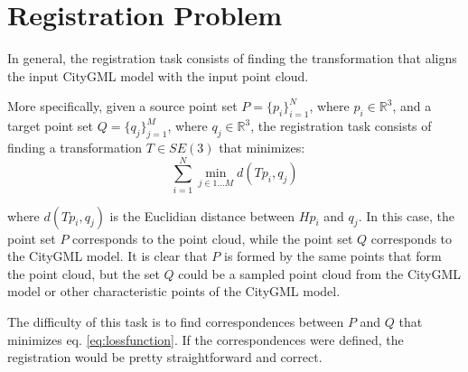     \section{Registration Problem}
    In general, the registration task consists of finding the transformation that aligns the input CityGML model with the input point cloud.

    More specifically, given a source point set $P = \{p_i\}_{i=1}^N$, where $p_i \in \mathbb {R}^{3}$,
    and a target point set $Q = \{q_j\}_{j=1}^M$, where $q_j \in \mathbb {R}^{3}$, 
    the registration task consists of finding a transformation $T \in SE(3)$ that minimizes:
    \begin{equation}
        \label{eq:lossfunction}
        \sum_{i = 1}^{N} \min_{j \in {1...M}} d( T p_i , q_j )    
    \end{equation}
      
    where $d(T p_i, q_j)$ is the Euclidian distance between $H p_i$ and $q_j$.
    In this case, the point set $P$ corresponds to the point cloud, while the point set $Q$ corresponds to the CityGML model.
    It is clear that $P$ is formed by the same points that form the point cloud, 
    but the set $Q$ could be a sampled point cloud from the CityGML model
    or other characteristic points of the CityGML model.
    
    The difficulty of this task is to find correspondences between $P$ and $Q$ that minimizes eq. \ref{eq:lossfunction}.
    If the correspondences were defined, the registration would be pretty straightforward and correct.

    
        

